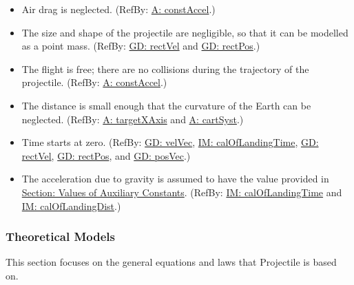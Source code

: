 \documentclass[12pt]{article}
\begin{document}
\begin{itemize}
\item[neglectDrag:\phantomsection\label{neglectDrag}]{Air drag is neglected. (RefBy: \hyperref[constAccel]{A: constAccel}.)}
\item[pointMass:\phantomsection\label{pointMass}]{The size and shape of the projectile are negligible, so that it can be modelled as a point mass. (RefBy: \hyperref[GD:rectVel]{GD: rectVel} and \hyperref[GD:rectPos]{GD: rectPos}.)}
\item[freeFlight:\phantomsection\label{freeFlight}]{The flight is free; there are no collisions during the trajectory of the projectile. (RefBy: \hyperref[constAccel]{A: constAccel}.)}
\item[neglectCurv:\phantomsection\label{neglectCurv}]{The distance is small enough that the curvature of the Earth can be neglected. (RefBy: \hyperref[targetXAxis]{A: targetXAxis} and \hyperref[cartSyst]{A: cartSyst}.)}
\item[timeStartZero:\phantomsection\label{timeStartZero}]{Time starts at zero. (RefBy: \hyperref[GD:velVec]{GD: velVec}, \hyperref[IM:calOfLandingTime]{IM: calOfLandingTime}, \hyperref[GD:rectVel]{GD: rectVel}, \hyperref[GD:rectPos]{GD: rectPos}, and \hyperref[GD:posVec]{GD: posVec}.)}
\item[gravAccelValue:\phantomsection\label{gravAccelValue}]{The acceleration due to gravity is assumed to have the value provided in \hyperref[Sec:AuxConstants]{Section: Values of Auxiliary Constants}. (RefBy: \hyperref[IM:calOfLandingTime]{IM: calOfLandingTime} and \hyperref[IM:calOfLandingDist]{IM: calOfLandingDist}.)}
\end{itemize}
\subsubsection{Theoretical Models}
\label{Sec:TMs}
This section focuses on the general equations and laws that Projectile is based on.
\end{document}

